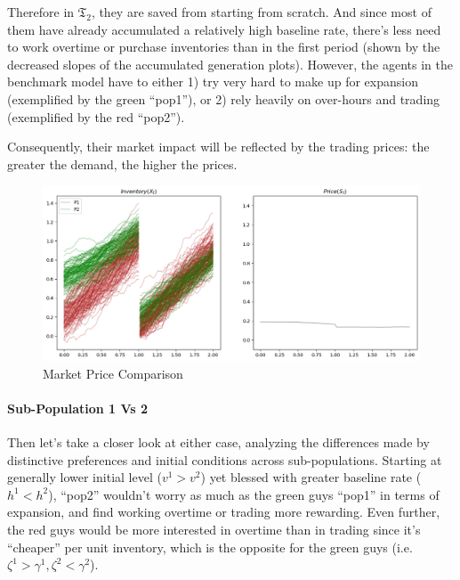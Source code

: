 \documentclass[a4paper,10pt]{article}
\newcommand{\1}{\mathbf{1}}
\begin{document}
Therefore in \textbf{\(\mathfrak{T}_2\)}, they are saved from starting from scratch. And since most of them have already accumulated a relatively high baseline rate, there's less need to work overtime or purchase inventories than in the first period (shown by the decreased slopes of the accumulated generation plots). However, the agents in the benchmark model have to either 1) try very hard to make up for expansion (exemplified by the green ``pop1''), or 2) rely heavily on over-hours and trading (exemplified by the red ``pop2'').

Consequently, their market impact will be reflected by the trading prices: the greater the demand, the higher the prices. 

\begin{center}
\begin{figure}
    \centering
    \includegraphics[]{2Period/Joint_Optim_2Prdx1/Illustration_diagrams/InvAndPrice.png}
    \caption{Market Price Comparison}
    \label{fig:price}
\end{figure}
\end{center}

\paragraph{Sub-Population 1 Vs 2}

Then let's take a closer look at either case, analyzing the differences
made by distinctive preferences and initial conditions across
sub-populations. Starting at generally lower initial level (\(v^1>v^2\))
yet blessed with greater baseline rate (\(h^1<h^2\)), ``pop2'' wouldn't
worry as much as the green guys ``pop1'' in terms of expansion, and find
working overtime or trading more rewarding. Even further, the red guys
would be more interested in overtime than in trading since it's
``cheaper'' per unit inventory, which is the opposite for the green guys
(i.e.~\(\zeta^1>\gamma^1, \zeta^2<\gamma^2\)).
\end{document}
